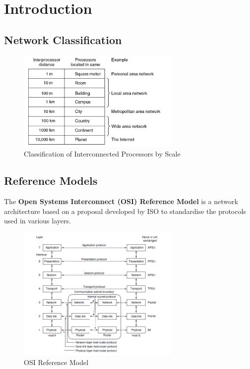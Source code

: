 \documentclass[a4paper,11pt]{article}
\begin{document}
\section{Introduction}
\subsection{Network Classification}
\begin{figure}[h]
    \centering
    \includegraphics[width=0.7\textwidth]{./images/classification_of_interconnected_processors_by_scale.png}
    \caption{Classification of Interconnected Processors by Scale}
\end{figure}

\subsection{Reference Models}
The \textbf{Open Systems Interconnect (OSI) Reference Model}  is a network architecture based on a proposal developed by ISO 
to standardise the protocols used in various layers.
\begin{figure}[h]
    \centering
    \includegraphics[width=0.7\textwidth]{./images/osireferencemodel.png}
    \caption{OSI Reference Model}
\end{figure}
\end{document}
